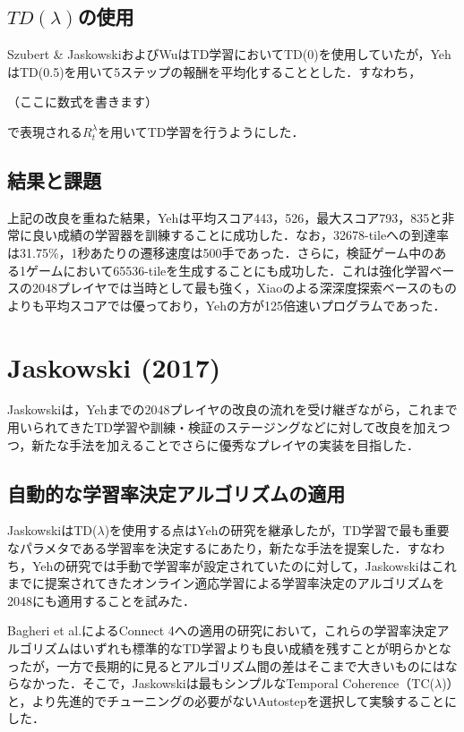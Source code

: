 \documentclass{suribt}
\begin{document}
\subsection{$TD(\lambda)$の使用}
Szubert \& JaskowskiおよびWuはTD学習においてTD(0)を使用していたが，YehはTD(0.5)を用いて5ステップの報酬を平均化することとした．すなわち，

（ここに数式を書きます）

で表現される$R^{\lambda}_t$を用いてTD学習を行うようにした．

\subsection{結果と課題}
上記の改良を重ねた結果，Yehは平均スコア443，526，最大スコア793，835と非常に良い成績の学習器を訓練することに成功した．なお，32678-tileへの到達率は31.75\%，1秒あたりの遷移速度は500手であった．さらに，検証ゲーム中のある1ゲームにおいて65536-tileを生成することにも成功した．これは強化学習ベースの2048プレイヤでは当時として最も強く，Xiaoのよる深深度探索ベースのものよりも平均スコアでは優っており，Yehの方が125倍速いプログラムであった．

\section{Jaskowski (2017)}
Jaskowskiは，Yehまでの2048プレイヤの改良の流れを受け継ぎながら，これまで用いられてきたTD学習や訓練・検証のステージングなどに対して改良を加えつつ，新たな手法を加えることでさらに優秀なプレイヤの実装を目指した．

\subsection{自動的な学習率決定アルゴリズムの適用}
JaskowskiはTD(${\lambda}$)を使用する点はYehの研究を継承したが，TD学習で最も重要なパラメタである学習率を決定するにあたり，新たな手法を提案した．すなわち，Yehの研究では手動で学習率が設定されていたのに対して，Jaskowskiはこれまでに提案されてきたオンライン適応学習による学習率決定のアルゴリズムを2048にも適用することを試みた．

Bagheri et al.によるConnect 4への適用の研究において，これらの学習率決定アルゴリズムはいずれも標準的なTD学習よりも良い成績を残すことが明らかとなったが，一方で長期的に見るとアルゴリズム間の差はそこまで大きいものにはならなかった．そこで，Jaskowskiは最もシンプルなTemporal Coherence（TC(${\lambda}$)）と，より先進的でチューニングの必要がないAutostepを選択して実験することにした．
\end{document}
